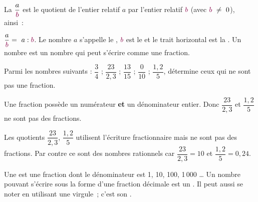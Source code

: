 

\begin{aconnaitre}
La  $\dfrac{a}{\textcolor{C1}{b}}$ est le quotient de l'entier relatif $a$ par l'entier relatif $\textcolor{C1}{b}$ (avec $\textcolor{C1}{b} \neq 0$), ainsi :

$\dfrac{a}{\textcolor{C1}{b}} = a : \textcolor{C1}{b}$. Le nombre $a$ s'appelle le , $\textcolor{C1}{b}$ est le  et le trait horizontal est la . Un nombre  est un nombre qui peut s'écrire comme une fraction.
\end{aconnaitre}


\begin{methode*1}

\begin{exemple*1}
Parmi les nombres suivants : $\dfrac{3}{4}$  ; $\dfrac{23}{2,3}$ ; $\dfrac{13}{15}$ ; $\dfrac{0}{10}$ ;   $\dfrac{1,2}{5}$, détermine ceux qui ne sont pas une fraction.

\vspace{.5em}

Une fraction possède un numérateur \textbf{et} un dénominateur entier. Donc $\dfrac{23}{2,3}$ et $\dfrac{1,2}{5}$ ne sont pas des fractions.
 \end{exemple*1}
 
\begin{remarque}
Les quotients $\dfrac{23}{2,3}$, $\dfrac{1,2}{5}$ utilisent l'écriture fractionnaire mais ne sont pas des fractions. Par contre ce sont des nombres rationnels car $\dfrac{23}{2,3} = 10$ et $\dfrac{1,2}{5} = 0,24$.
 \end{remarque}
 
  \exercice  

 \end{methode*1}


\begin{aconnaitre}
Une  est une fraction dont le dénominateur est 1, 10, 100, 1\,000 \ldots
Un nombre pouvant s'écrire sous la forme d'une fraction décimale est un . Il peut aussi se noter en utilisant une virgule ; c'est son .
\end{aconnaitre}

